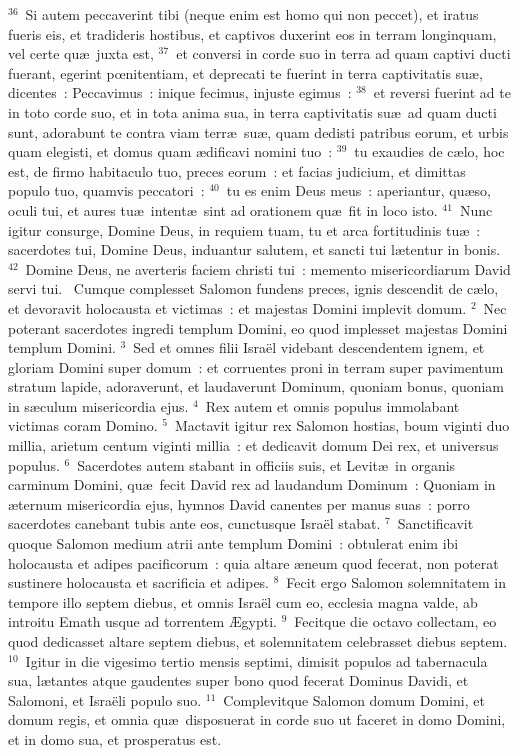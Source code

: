 ${}^{36}$~Si autem peccaverint tibi (neque enim est homo qui non peccet), et iratus fueris eis, et tradideris hostibus, et captivos duxerint eos in terram longinquam, vel certe qu\ae\ juxta est,
${}^{37}$~et conversi in corde suo in terra ad quam captivi ducti fuerant, egerint pœnitentiam, et deprecati te fuerint in terra captivitatis su\ae , dicentes~: Peccavimus~: inique fecimus, injuste egimus~:
${}^{38}$~et reversi fuerint ad te in toto corde suo, et in tota anima sua, in terra captivitatis su\ae\ ad quam ducti sunt, adorabunt te contra viam terr\ae\ su\ae , quam dedisti patribus eorum, et urbis quam elegisti, et domus quam \ae dificavi nomini tuo~:
${}^{39}$~tu exaudies de c\ae lo, hoc est, de firmo habitaculo tuo, preces eorum~: et facias judicium, et dimittas populo tuo, quamvis peccatori~:
${}^{40}$~tu es enim Deus meus~: aperiantur, qu\ae so, oculi tui, et aures tu\ae\ intent\ae\ sint ad orationem qu\ae\ fit in loco isto.
${}^{41}$~Nunc igitur consurge, Domine Deus, in requiem tuam, tu et arca fortitudinis tu\ae~: sacerdotes tui, Domine Deus, induantur salutem, et sancti tui l\ae tentur in bonis.
${}^{42}$~Domine Deus, ne averteris faciem christi tui~: memento misericordiarum David servi tui.
~\lettrine[lines=10,image=true,loversize=0.05,lraise=-0.03]{C}{}umque complesset Salomon fundens preces, ignis descendit de c\ae lo, et devoravit holocausta et victimas~: et majestas Domini implevit domum.
${}^{2}$~Nec poterant sacerdotes ingredi templum Domini, eo quod implesset majestas Domini templum Domini.
${}^{3}$~Sed et omnes filii Isra\"el videbant descendentem ignem, et gloriam Domini super domum~: et corruentes proni in terram super pavimentum stratum lapide, adoraverunt, et laudaverunt Dominum, quoniam bonus, quoniam in s\ae culum misericordia ejus.
${}^{4}$~Rex autem et omnis populus immolabant victimas coram Domino.
${}^{5}$~Mactavit igitur rex Salomon hostias, boum viginti duo millia, arietum centum viginti millia~: et dedicavit domum Dei rex, et universus populus.
${}^{6}$~Sacerdotes autem stabant in officiis suis, et Levit\ae\ in organis carminum Domini, qu\ae\ fecit David rex ad laudandum Dominum~: Quoniam in \ae ternum misericordia ejus, hymnos David canentes per manus suas~: porro sacerdotes canebant tubis ante eos, cunctusque Isra\"el stabat.
${}^{7}$~Sanctificavit quoque Salomon medium atrii ante templum Domini~: obtulerat enim ibi holocausta et adipes pacificorum~: quia altare \ae neum quod fecerat, non poterat sustinere holocausta et sacrificia et adipes.
${}^{8}$~Fecit ergo Salomon solemnitatem in tempore illo septem diebus, et omnis Isra\"el cum eo, ecclesia magna valde, ab introitu Emath usque ad torrentem \AE gypti.
${}^{9}$~Fecitque die octavo collectam, eo quod dedicasset altare septem diebus, et solemnitatem celebrasset diebus septem.
${}^{10}$~Igitur in die vigesimo tertio mensis septimi, dimisit populos ad tabernacula sua, l\ae tantes atque gaudentes super bono quod fecerat Dominus Davidi, et Salomoni, et Isra\"eli populo suo.
${}^{11}$~Complevitque Salomon domum Domini, et domum regis, et omnia qu\ae\ disposuerat in corde suo ut faceret in domo Domini, et in domo sua, et prosperatus est.


